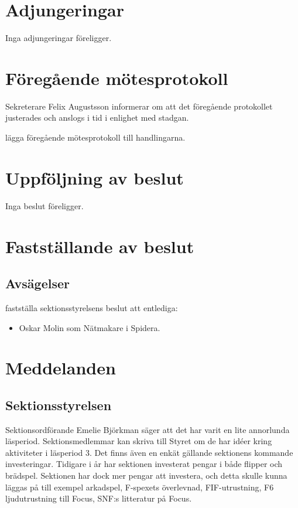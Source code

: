 \documentclass[hidelinks]{sektionsmote}
\begin{document}
\section{Adjungeringar}
Inga adjungeringar föreligger.


\section{Föregående mötesprotokoll}
Sekreterare Felix Augustsson informerar om att det föregående protokollet justerades och anslogs i tid i enlighet med stadgan.
\begin{beslut}
    \item lägga föregående mötesprotokoll till handlingarna. 
\end{beslut}


\section{Uppföljning av beslut}
Inga beslut föreligger.


\section{Fastställande av beslut}
\subsection{Avsägelser}
\begin{beslut}
  \item fastställa sektionsstyrelsens beslut att entlediga:
  \begin{itemize}
      \item Oskar Molin som Nätmakare i Spidera.
  \end{itemize}
\end{beslut}


\section{Meddelanden}
\subsection{Sektionsstyrelsen}
Sektionsordförande Emelie Björkman säger att det har varit en lite annorlunda läsperiod.
Sektionsmedlemmar kan skriva till Styret om de har idéer kring aktiviteter i läsperiod 3.
Det finns även en enkät gällande sektionens kommande investeringar.
Tidigare i år har sektionen investerat pengar i både flipper och brädspel.
Sektionen har dock mer pengar att investera, och detta skulle kunna läggas på till exempel arkadspel, F-spexets överlevnad, FIF-utrustning, F6 ljudutrustning till Focus, SNF:s litteratur på Focus.
\end{document}
